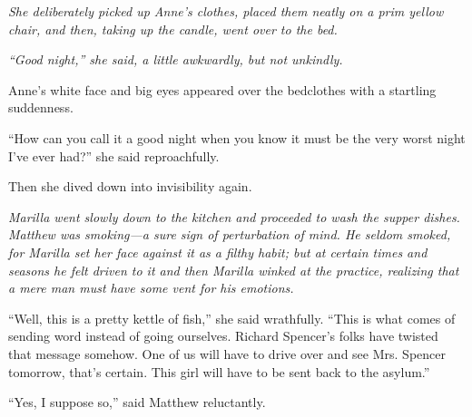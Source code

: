 \documentclass[a4paper]{article}
\begin{document}
{\itshape She deliberately picked up Anne's clothes, placed them neatly on a prim yellow chair, and then, taking up the candle, went over to the bed.}

\itshape ``Good night,'' she said, a little awkwardly, but not unkindly.

Anne's white face and big eyes appeared over the bedclothes with a startling suddenness.

``How can you call it a good night when you know it must be the very worst night I've ever had?'' she said reproachfully.

Then she dived down into invisibility again. \upshape

{\itshape Marilla went slowly down to the kitchen and proceeded to wash the supper dishes. Matthew was smoking---a sure sign of perturbation of mind. He seldom smoked, for Marilla set her face against it as a filthy habit; but at certain times and seasons he felt driven to it and then Marilla winked at the practice, realizing that a mere man must have some vent for his emotions.

``Well, this is a pretty kettle of fish,'' she said wrathfully. ``This is what comes of sending word instead of going ourselves. Richard Spencer's folks have twisted that message somehow. One of us will have to drive over and see Mrs. Spencer tomorrow, that's certain. This girl will have to be sent back to the asylum.''

``Yes, I suppose so,'' said Matthew reluctantly.}
\end{document}
